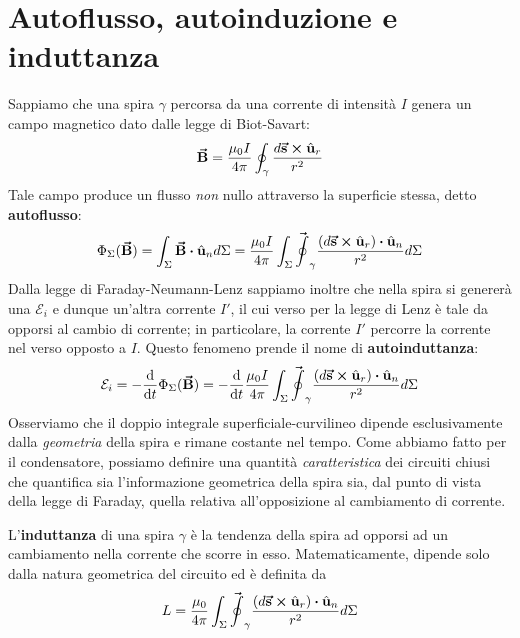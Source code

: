 \section{Autoflusso, autoinduzione e induttanza}
Sappiamo che una spira $\gamma$ percorsa da una corrente di intensità $I$ genera un campo magnetico dato dalle legge di Biot-Savart:
\begin{equation*}
	\vb*{\va{B}}=\frac{\mu_0 I}{4\pi}\oint_{\gamma}\frac{d\vb*{\va{s}}\cross\hat{\mathbf{u}}_{r}}{r^2}
\end{equation*}
Tale campo produce un flusso \textit{non} nullo attraverso la superficie stessa, detto \textbf{autoflusso}:
\begin{equation}
	\Phi_{\Sigma}(\vba{B})=\int_{\Sigma}\vba{B}\vdot\vbh{u}_nd\Sigma=\frac{\mu_0 I}{4\pi}\int_{\Sigma}\vba\oint_{\gamma}\frac{\left(d\vba{s}\cross\vbh{u}_{r}\right)\vdot \vbh{u}_n}{r^2}d\Sigma
\end{equation}
Dalla legge di Faraday-Neumann-Lenz sappiamo inoltre che nella spira si genererà una \fem $\mathcal{E}_i$ e dunque un'altra corrente $I'$, il cui verso per la legge di Lenz è tale da opporsi al cambio di corrente; in particolare, la corrente $I'$ percorre la corrente nel verso opposto a $I$. Questo fenomeno prende il nome di \textbf{autoinduttanza}:
\begin{equation*}
	\mathcal{E}_i=-\dv{t}\Phi_{\Sigma}(\vba{B})=-\dv{t}\frac{\mu_0 I}{4\pi}\int_{\Sigma}\vba\oint_{\gamma}\frac{\left(d\vba{s}\cross\vbh{u}_{r}\right)\vdot \vbh{u}_n}{r^2}d\Sigma
\end{equation*} %
Osserviamo che il doppio integrale superficiale-curvilineo dipende esclusivamente dalla \textit{geometria} della spira e rimane costante nel tempo. Come abbiamo fatto per il condensatore, possiamo definire una quantità \textit{caratteristica} dei circuiti chiusi che quantifica sia l'informazione geometrica della spira sia, dal punto di vista della legge di Faraday, quella relativa all'opposizione al cambiamento di corrente. 
\begin{define}[Induttanza]
	L'\textbf{induttanza} di una spira $\gamma$ è la tendenza della spira ad opporsi ad un cambiamento nella corrente che scorre in esso. Matematicamente, dipende solo dalla natura geometrica del circuito ed è definita da
	\begin{equation}
		L=\frac{\mu_0}{4\pi}\int_{\Sigma}\vba\oint_{\gamma}\frac{\left(d\vba{s}\cross\vbh{u}_{r}\right)\vdot \vbh{u}_n}{r^2}d\Sigma
	\end{equation}
\end{define}
